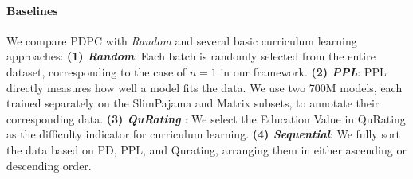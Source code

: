 \documentclass[11pt]{article}
\begin{document}
\paragraph{Baselines} We compare PDPC with \textit{Random} and several basic curriculum learning approaches:
\textbf{(1) \textit{Random}}: Each batch is randomly selected from the entire dataset, corresponding to the case of \(n=1\) in our framework.
\textbf{(2) \textit{PPL}}: PPL directly measures how well a model fits the data. We use two 700M models, each trained separately on the SlimPajama and Matrix subsets, to annotate their corresponding data.
\textbf{(3) \textit{QuRating}} \cite{wettig2024qurating}:  We select the Education Value in QuRating as the difficulty indicator for curriculum learning.
\textbf{(4) \textit{Sequential}}: We fully sort the data based on PD, PPL, and Qurating, arranging them in either ascending or descending order.
\end{document}
